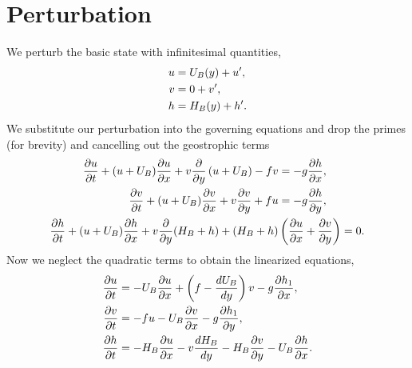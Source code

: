 \documentclass[letterpaper,10pt,english]{sphinxmanual}
\begin{document}
\section{Perturbation}
\label{linear_stability:perturbation}
We perturb the basic state with infinitesimal quantities,
\begin{gather}
\begin{split}\begin{aligned}
u & = U_B(y) + u', \\
v & = 0     + v',\\
h & = H_B(y) + h'.\end{aligned}\end{split}\notag
\end{gather}
We substitute our perturbation into the governing equations and drop the
primes (for brevity) and cancelling out the geostrophic terms
\begin{gather}
\begin{split}\begin{aligned}
\frac{\partial u}{\partial t} + (u + U_B) \frac{\partial u}{\partial x} + v \frac{\partial}{\partial y} \left(u + U_B \right)  - f v & = - g \frac{\partial h}{\partial x}, \\
 \frac{\partial v}{\partial t}   + (u + U_B) \frac{\partial v}{\partial x} + v \frac{\partial v }{\partial y} + f u
 & = - g \frac{\partial h}{\partial y}, \\
\frac{\partial h}{\partial t}  + (u + U_B) \frac{\partial h}{\partial x}   + v \frac{\partial}{\partial y}(H_B + h)
+ (H_B + h)  & \left( \frac{\partial u}{\partial x} + \frac{\partial v}{\partial y} \right) =  0.\end{aligned}\end{split}\notag
\end{gather}
Now we neglect the quadratic terms to obtain the linearized equations,
\begin{gather}
\begin{split}\begin{aligned}
\frac{\partial u}{\partial t}
& = - U_B \frac{\partial u}{\partial x} + \left( f - \frac{d U_B}{d y}  \right) v  - g \frac{\partial h_1}{\partial x}, \\
 \frac{\partial v}{\partial t}    & =  - f u  - U_B \frac{\partial v}{\partial x}  - g \frac{\partial h_1}{\partial y}, \\
\frac{\partial h}{\partial t}   & = - H_B \frac{\partial u}{\partial x}    - v \frac{d H_B}{d y}
 - H_B \frac{\partial v}{\partial y} - U_B \frac{\partial h}{\partial x} .\end{aligned}\end{split}\notag
\end{gather}
\end{document}
